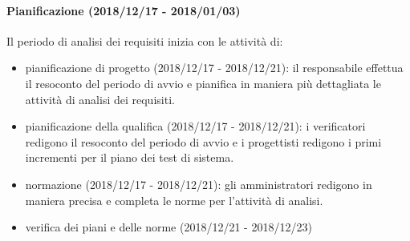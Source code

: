 		\paragraph{Pianificazione (2018/12/17 - 2018/01/03)} Il periodo di analisi dei requisiti inizia con le attività di:
			\begin{itemize}
				\item pianificazione di progetto (2018/12/17 - 2018/12/21): il responsabile effettua il resoconto del periodo di avvio e pianifica in maniera più dettagliata le attività di analisi dei requisiti. 
				\item pianificazione della qualifica (2018/12/17 - 2018/12/21): i verificatori redigono il resoconto del periodo di avvio e i progettisti redigono i primi incrementi per il piano dei test di sistema. 
				\item normazione (2018/12/17 - 2018/12/21): gli amministratori redigono in maniera precisa e completa le norme per l'attività di analisi. 
				\item verifica dei piani e delle norme (2018/12/21 - 2018/12/23)
			\end{itemize}
		
